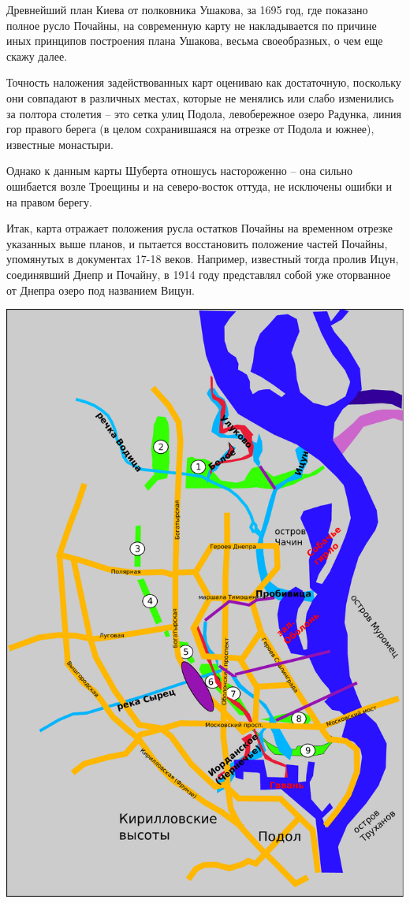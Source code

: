 Древнейший план Киева от полковника Ушакова, за 1695 год, где показано полное русло Почайны, на современную карту не накладывается по причине иных принципов построения плана Ушакова, весьма своеобразных, о чем еще скажу далее.

Точность наложения задействованных карт оцениваю как достаточную, поскольку они совпадают в различных местах, которые не менялись или слабо изменились за полтора столетия – это сетка улиц Подола, левобережное озеро Радунка, линия гор правого берега (в целом сохранившаяся на отрезке от Подола и южнее), известные монастыри. 

Однако к данным карты Шуберта отношусь настороженно – она сильно ошибается возле Троещины и на северо-восток оттуда, не исключены ошибки и на правом берегу.

Итак, карта отражает положения русла остатков Почайны на временном отрезке указанных выше планов, и пытается восстановить положение частей Почайны, упомянутых в документах 17-18 веков. Например, известный тогда пролив Ицун, соединявший Днепр и Почайну, в 1914 году представлял собой уже оторванное от Днепра озеро под названием Вицун.

\newpage
\vspace*{\fill}
\begin{center}
\includegraphics[width=\linewidth]{chast-colebanie-osnov/pochayna/posh2.pdf}
\end{center}
\vspace*{\fill}
\newpage

